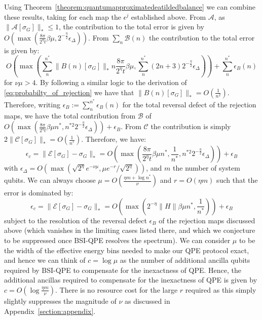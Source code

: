 \documentclass[aps,floatfix,10pt,amssymb,amsfont,amsmath,superscriptaddress,float,nofootinbib,longbibliography,nobalancelastpage,twocolumn]{revtex4-2}
\begin{document}
\begin{widetext}
Using Theorem~\ref{theorem:quantumapproximatedeatildedbalance} we can combine these results, taking for each map the $\epsilon^j$ established above. From $\mathcal{A}$, as $\|\mathcal{A}[\sigma_G]\|_* \leq 1$, the contribution to the total error is given by $O(\max(\frac{8\pi}{2^{\eta}t}\beta\mu,2^{-\frac{\eta}{2}}\epsilon_{\Delta}))$. From $\sum_n\mathcal{B}(n)$ the contribution to the total error is given by:
\begin{equation}
    O(\max(\sum^{n^*}_{n}\|B(n)[\sigma_G]\|_* n\frac{8\pi}{2^{\eta}t}\beta \mu ,\sum^{n^*}_{n}(2n+3)2^{-\frac{\eta}{2}}\epsilon_{\Delta})) + \sum_{n}^{n^*}\epsilon_B(n)
\end{equation}
for $\nu \mu > 4$. By following a similar logic to the derivation of \eqref{eq:probabilty_of_rejection} we have that $\|B(n)[\sigma_G]\|_* = O(\frac{1}{n^2})$. Therefore, writing $\epsilon_B := \sum_{n}^{n^*}\epsilon_B(n)$ for the total reversal defect of the rejection maps, we have the total contribution from $\mathcal{B}$ of $O(\max(\frac{8\pi}{2^{\eta}t}\beta \mu n^*,n^{*2}2^{-\frac{\eta}{2}}\epsilon_{\Delta})) + \epsilon_B$. From $\mathcal{C}$ the contribution is simply $2\|\mathcal{C}[\sigma_G]\|_* = O(\frac{1}{n^*})$. Therefore, we have:
 \begin{equation}
   \epsilon_c = \|\mathcal{E}[\sigma_G] - \sigma_G\|_* = O\left(\max\left( \frac{8\pi}{2^{\eta}t}\beta\mu n^* ,\frac{1}{n^*}, n^{*2}2^{-\frac{\eta}{2}}\epsilon_{\Delta}\right)\right) + \epsilon_B
\end{equation}
with $\epsilon_{\Delta}=O(\max(\sqrt{2^{\eta}}e^{-\nu\mu},\mu e^{-r}/\sqrt{2^{\eta}}))$, and $m$ the number of system qubits. We can always choose $\mu = O(\frac{\eta m + \log n^*}{\nu})$ and $r=O(\eta m)$ such that the error is dominated by:
 \begin{equation}
   \epsilon_c = \|\mathcal{E}[\sigma_G] - \sigma_G\|_* = O\left(\max\left( 2^{-\eta}\|H\|\beta\mu n^* ,\frac{1}{n^*}\right)\right) + \epsilon_B
    \label{eq:error_bound}
\end{equation}
subject to the resolution of the reversal defect $\epsilon_B$ of the rejection maps discussed above (which vanishes in the limiting cases listed there, and which we conjecture to be suppressed once BSI-QPE resolves the spectrum). We can consider $\mu$ to be the width of the effective energy bins needed to make our QPE protocol exact, and hence we can think of $c = \log \mu$ as the number of additional ancilla qubits required by BSI-QPE to compensate for the inexactness of QPE. Hence, the additional ancillas required to compensate for the inexactness of QPE is given by $c = O(\log \frac{\eta m}{\nu})$. There is no resource cost for the large $r$ required as this simply slightly suppresses the magnitude of $\nu$ as discussed in Appendix~\ref{section:appendix}.


\end{widetext}
\end{document}
